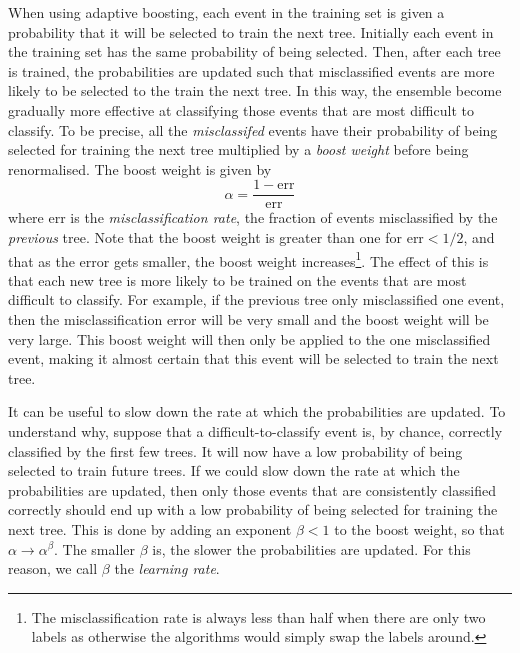 \documentclass[11pt]{cuthesis}
\begin{document}
When using adaptive boosting, each event in the training set is given a probability that it will be selected to train the next tree. Initially each event in the training set has the same probability of being selected. Then, after each tree is trained, the probabilities are updated such that misclassified events are more likely to be selected to the train the next tree. In this way, the ensemble become gradually more effective at classifying those events that are most difficult to classify. To be precise, all the \textit{misclassifed} events have their probability of being selected for training the next tree multiplied by a \textit{boost weight} before being renormalised. The boost weight is given by \cite{tmva_guide}
\begin{equation}
\alpha = \frac{1 - \text{err}}{\text{err}} 
\end{equation}
where err is the \textit{misclassification rate}, the fraction of events misclassified by the \textit{previous} tree. Note that the boost weight is greater than one for err$<1/2$, and that as the error gets smaller, the boost weight increases\footnote{The misclassification rate is always less than half when there are only two labels as otherwise the algorithms would simply swap the labels around.}. The effect of this is that each new tree is more likely to be trained on the events that are most difficult to classify. For example, if the previous tree only misclassified one event, then the misclassification error will be very small and the boost weight will be very large. This boost weight will then only be applied to the one misclassified event, making it almost certain that this event will be selected to train the next tree. 

It can be useful to slow down the rate at which the probabilities are updated. To understand why, suppose that a difficult-to-classify event is, by chance, correctly classified by the first few trees. It will now have a low probability of being selected to train future trees. If we could slow down the rate at which the probabilities are updated, then only those events that are consistently classified correctly should end up with a low probability of being selected for training the next tree. This is done by adding an exponent $\beta<1$ to the boost weight, so that $\alpha \rightarrow \alpha^\beta$. The smaller $\beta$ is, the slower the probabilities are updated. For this reason, we call $\beta$ the \textit{learning rate}.
\end{document}
